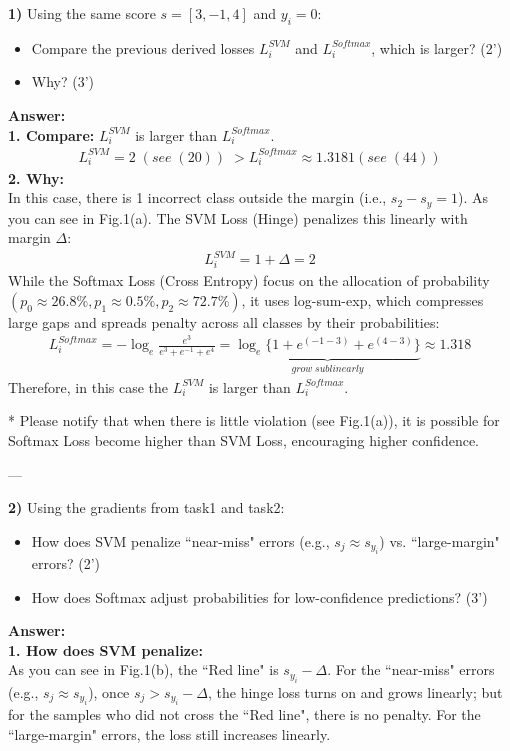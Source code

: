 \documentclass[12pt,a4paper]{article}
\begin{document}
	\textbf{1)}  
	Using the same score $s = [3,-1,4]$ and $y_i = 0$:
	\begin{itemize}[itemsep=0pt, topsep=0pt, parsep=0pt, partopsep=0pt]
		\item Compare the previous derived losses $L_i^{SVM}$ and $L_i^{Softmax}$, which is larger? (2’)
		\item Why? (3’)
	\end{itemize}

	\textbf{Answer:}\\
	\textbf{1. Compare:} $L_i^{SVM}$ is larger than $L_i^{Softmax}$.
	\begin{align}
		L_i^{SVM}=2\; (see\; (20))\; > L_i^{Softmax}\approx 1.3181(see\; (44))
	\end{align}
	\textbf{2. Why:}\\
	In this case, there is 1 incorrect class outside the margin (i.e., $s_2 - s_y=1$). As you can see in Fig.1(a). The SVM Loss (Hinge) penalizes this linearly with margin $\Delta$:
	\begin{align}
		L_i^{SVM}=1+\Delta=2
	\end{align}
	While the Softmax Loss (Cross Entropy) focus on the allocation of probability $(p_0\approx26.8\%, p_1\approx0.5\%, p_2\approx72.7\%)$, it uses log-sum-exp, which compresses large gaps and spreads penalty across all classes by their probabilities:
	\begin{align}
		L_i^{Softmax}=-\log_e\frac{e^3}{e^3+e^{-1}+e^4}=\underbrace{\log_e\{1+e^{(-1-3)}+e^{(4-3)}\}}_{grow\; sublinearly}\approx 1.318
	\end{align}
	Therefore, in this case the $L_i^{SVM}$ is larger than $L_i^{Softmax}$.
	
	* Please notify that when there is little violation (see Fig.1(a)), it is possible for Softmax Loss become higher than SVM Loss, encouraging higher confidence.
	
	---
	
	\textbf{2)}
	Using the gradients from task1 and task2:
	\begin{itemize}[itemsep=0pt, topsep=0pt, parsep=0pt, partopsep=0pt]
		\item How does SVM penalize ``near-miss" errors (e.g., $s_j\approx s_{y_i}$) vs. ``large-margin" errors? (2’)
		\item How does Softmax adjust probabilities for low-confidence predictions? (3’)
	\end{itemize}
	
	\textbf{Answer:}\\
	\textbf{1. How does SVM penalize:}\\
	As you can see in Fig.1(b), the ``Red line" is $s_{y_i} - \Delta$. For the ``near-miss" errors (e.g., $s_j\approx s_{y_i}$), once $s_j>s_{y_i} - \Delta$, the hinge loss turns on and grows linearly; but for the samples who did not cross the ``Red line", there is no penalty. For the ``large-margin" errors, the loss still increases linearly.
	
\end{document}
